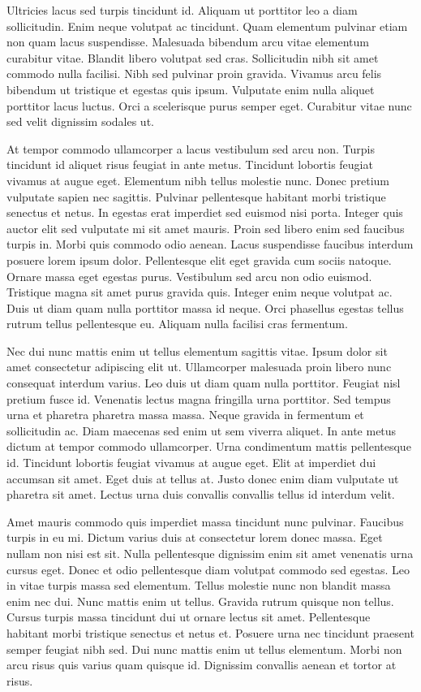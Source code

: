 \documentclass[11pt,a4paper]{article}
\begin{document}
Ultricies lacus sed turpis tincidunt id. Aliquam ut porttitor leo a diam sollicitudin. Enim neque volutpat ac tincidunt. Quam elementum pulvinar etiam non quam lacus suspendisse. Malesuada bibendum arcu vitae elementum curabitur vitae. Blandit libero volutpat sed cras. Sollicitudin nibh sit amet commodo nulla facilisi. Nibh sed pulvinar proin gravida. Vivamus arcu felis bibendum ut tristique et egestas quis ipsum. Vulputate enim nulla aliquet porttitor lacus luctus. Orci a scelerisque purus semper eget. Curabitur vitae nunc sed velit dignissim sodales ut.

At tempor commodo ullamcorper a lacus vestibulum sed arcu non. Turpis tincidunt id aliquet risus feugiat in ante metus. Tincidunt lobortis feugiat vivamus at augue eget. Elementum nibh tellus molestie nunc. Donec pretium vulputate sapien nec sagittis. Pulvinar pellentesque habitant morbi tristique senectus et netus. In egestas erat imperdiet sed euismod nisi porta. Integer quis auctor elit sed vulputate mi sit amet mauris. Proin sed libero enim sed faucibus turpis in. Morbi quis commodo odio aenean. Lacus suspendisse faucibus interdum posuere lorem ipsum dolor. Pellentesque elit eget gravida cum sociis natoque. Ornare massa eget egestas purus. Vestibulum sed arcu non odio euismod. Tristique magna sit amet purus gravida quis. Integer enim neque volutpat ac. Duis ut diam quam nulla porttitor massa id neque. Orci phasellus egestas tellus rutrum tellus pellentesque eu. Aliquam nulla facilisi cras fermentum.

Nec dui nunc mattis enim ut tellus elementum sagittis vitae. Ipsum dolor sit amet consectetur adipiscing elit ut. Ullamcorper malesuada proin libero nunc consequat interdum varius. Leo duis ut diam quam nulla porttitor. Feugiat nisl pretium fusce id. Venenatis lectus magna fringilla urna porttitor. Sed tempus urna et pharetra pharetra massa massa. Neque gravida in fermentum et sollicitudin ac. Diam maecenas sed enim ut sem viverra aliquet. In ante metus dictum at tempor commodo ullamcorper. Urna condimentum mattis pellentesque id. Tincidunt lobortis feugiat vivamus at augue eget. Elit at imperdiet dui accumsan sit amet. Eget duis at tellus at. Justo donec enim diam vulputate ut pharetra sit amet. Lectus urna duis convallis convallis tellus id interdum velit.

Amet mauris commodo quis imperdiet massa tincidunt nunc pulvinar. Faucibus turpis in eu mi. Dictum varius duis at consectetur lorem donec massa. Eget nullam non nisi est sit. Nulla pellentesque dignissim enim sit amet venenatis urna cursus eget. Donec et odio pellentesque diam volutpat commodo sed egestas. Leo in vitae turpis massa sed elementum. Tellus molestie nunc non blandit massa enim nec dui. Nunc mattis enim ut tellus. Gravida rutrum quisque non tellus. Cursus turpis massa tincidunt dui ut ornare lectus sit amet. Pellentesque habitant morbi tristique senectus et netus et. Posuere urna nec tincidunt praesent semper feugiat nibh sed. Dui nunc mattis enim ut tellus elementum. Morbi non arcu risus quis varius quam quisque id. Dignissim convallis aenean et tortor at risus.
\end{document}
